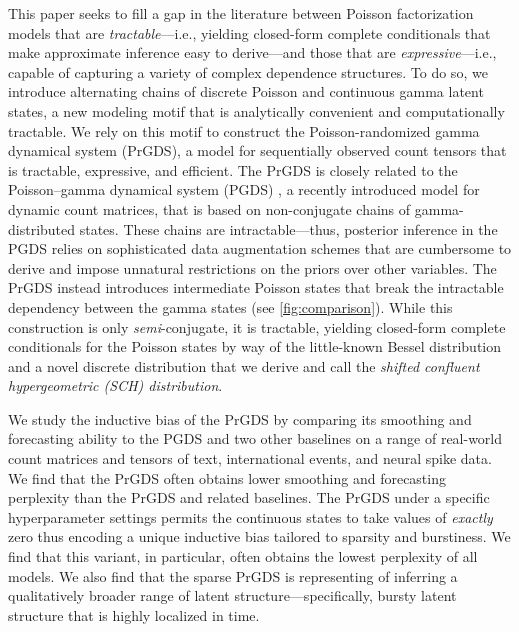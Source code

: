 \documentclass{article}
\begin{document}
This paper seeks to fill a gap in the literature between Poisson factorization models that are \emph{tractable}---i.e., yielding closed-form complete conditionals that make approximate inference easy to derive---and those that are \emph{expressive}---i.e., capable of capturing a variety of complex dependence structures. To do so, we introduce alternating chains of discrete Poisson and continuous gamma latent states, a new modeling motif that is analytically convenient and computationally tractable. We rely on this motif to construct the Poisson-randomized gamma dynamical system (PrGDS), a model for sequentially observed count tensors that is tractable, expressive, and efficient. The PrGDS is closely related to the Poisson--gamma dynamical system (PGDS) \cite{schein2016poisson}, a recently introduced model for dynamic count matrices, that is based on non-conjugate chains of gamma-distributed states. These chains are intractable---thus, posterior inference in the PGDS relies on sophisticated data augmentation schemes that are cumbersome to derive and impose unnatural restrictions on the priors over other variables. The PrGDS instead introduces intermediate Poisson states that break the intractable dependency between the gamma states (see \cref{fig:comparison}). While this construction is only \emph{semi}-conjugate, it is tractable, yielding closed-form complete conditionals for the Poisson states by way of the little-known Bessel distribution~\cite{yuan2000bessel} and a novel discrete distribution that we derive and call the \emph{shifted confluent hypergeometric (SCH) distribution}.~

We study the inductive bias of the PrGDS by comparing its smoothing and forecasting ability to the PGDS and two other baselines on a range of real-world count matrices and tensors of text, international events, and neural spike data. We find that the PrGDS often obtains lower smoothing and forecasting perplexity than the PrGDS and related baselines. The PrGDS under a specific hyperparameter settings permits the continuous states to take values of \emph{exactly} zero thus encoding a unique inductive bias tailored to sparsity and burstiness. We find that this variant, in particular, often obtains the lowest perplexity of all models. We also find that the sparse PrGDS is representing of inferring a qualitatively broader range of latent structure---specifically, bursty latent structure that is highly localized in time.~
\end{document}
